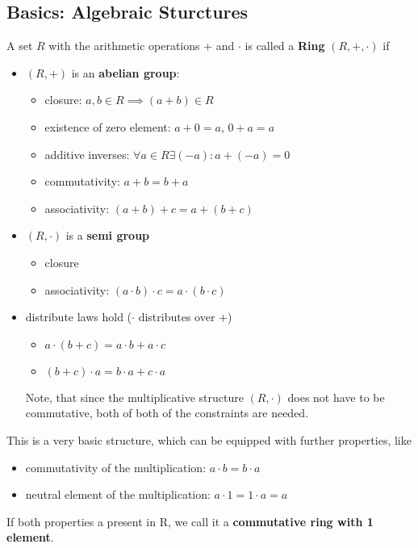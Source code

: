 
\subsection{Basics: Algebraic Sturctures}

\begin{definition}
	A set $R$ with the arithmetic operations $+$ and $\cdot$ is called a \textbf{Ring} $(R,+,\cdot)$ if
	\begin{itemize}
	\item $(R,+)$ is an \textbf{abelian group}:
		\begin{itemize}
		\item closure: $a,b \in R \implies (a+b)\in R $
		\item existence of zero element: $a+0=a$, $0+a=a$
		\item additive inverses: $\forall a \in R \exists (-a) : a + (-a) = 0$
		\item commutativity: $a+b=b+a$
		\item associativity: $(a+b)+c=a+(b+c)$
		\end{itemize}
	\item $(R, \cdot)$ is a \textbf{semi group}
		\begin{itemize}
			\item closure
			\item associativity: $(a \cdot b)\cdot c=a \cdot (b \cdot c)$
		\end{itemize}
	\item distribute laws hold ($\cdot$ distributes over $+$)
		\begin{itemize}
			\item $a \cdot (b+c) = a \cdot b + a \cdot c $
			\item $(b+c) \cdot a = b \cdot a + c \cdot a $
		\end{itemize}
		Note, that since the multiplicative structure $(R, \cdot)$ does not have to be commutative, both of both of the constraints are needed.
	\end{itemize}
\end{definition}

This is a very basic structure, which can be equipped with further properties, like
\begin{itemize}
	\item commutativity of the multiplication: $a \cdot b = b \cdot a$
	\item neutral element of the multiplication: $a \cdot 1 = 1 \cdot a = a$
\end{itemize}
If both properties a present in R, we call it a \textbf{commutative ring with 1 element}.

